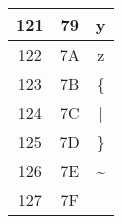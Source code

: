 {\begin{table}[H]
\begin{minipage}[t]{.32\textwidth}
\begin{tabular}{ccc}
        121 & 79 & y                   \\ \hline
        122 & 7A & z                   \\ \hline
        123 & 7B & \{                  \\ \hline
        124 & 7C & |                   \\ \hline
        125 & 7D & \}                  \\ \hline
        126 & 7E & \textasciitilde{}   \\ \hline
        127 & 7F &                     \\ \hline
        
        
      \end{tabular}
      
    \end{minipage}
    
  \end{table}
  
  
} %


